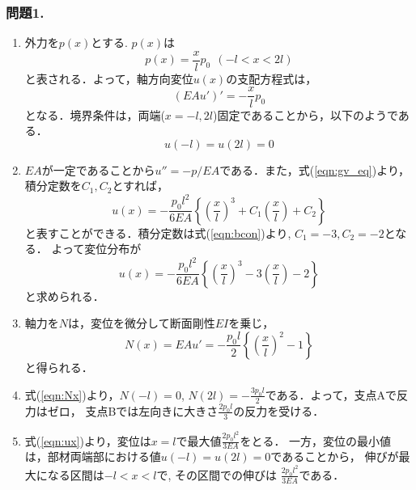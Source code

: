 \documentclass[10pt,a4j]{jarticle}
\begin{document}
\subsubsection*{問題1.}
\begin{enumerate}
\item
	外力を$p(x)$とする. $p(x)$は
	\begin{equation}
		p(x)=\frac{x}{l}p_0 
		\ \ \left(-l < x < 2l \right)
		\label{eqn:px}
	\end{equation}
	と表される．よって，軸方向変位$u(x)$の支配方程式は，
	\begin{equation}
		\left( EAu' \right)'=-\frac{x}{l}p_0
		\label{eqn:gv_eq}
	\end{equation}
	となる．境界条件は，両端($x=-l,2l$)固定であることから，以下のようである．
	\begin{equation}
		u(-l)=u(2l)=0
		\label{eqn:bcon}
	\end{equation}
\item
	$EA$が一定であることから$u''=-p/EA$である．また，式(\ref{eqn:gv_eq})より，
	積分定数を$C_1, C_2$とすれば，
	\begin{equation}
		u(x)=-\frac{p_0l^2}{6EA}\left\{
			\left( \frac{x}{l}\right)^3
			+
			C_1\left( \frac{x}{l}\right)
			+
			C_2
		\right\}
	\end{equation}
	と表すことができる．積分定数は式(\ref{eqn:bcon})より, $C_1=-3, C_2=-2$となる．
	よって変位分布が
	\begin{equation}
		u(x)=-\frac{p_0l^2}{6EA}\left\{
			\left( \frac{x}{l}\right)^3
			-
			3
			\left( \frac{x}{l}\right)
			-2
		\right\}
		\label{eqn:ux}
	\end{equation}
	と求められる．
\item
	軸力を$N$は，変位を微分して断面剛性$EI$を乗じ，
	\begin{equation}
		N(x)=EAu'=-\frac{p_0l}{2}
			\left\{
			\left(\frac{x}{l}\right)^2 -1
			\right\}
		\label{eqn:Nx}
	\end{equation}
	と得られる．
\item
	式(\ref{eqn:Nx})より，$N(-l)=0$,
	$N(2l)=-\frac{3p_0l}{2}$である．よって，支点Aで反力はゼロ，
	支点Bでは左向きに大きさ$\frac{2p_0l}{3}$の反力を受ける．
\item
	式(\ref{eqn:ux})より，変位は$x=l$で最大値$\frac{2p_0l^2}{3EA}$をとる．
	一方，変位の最小値は，部材両端部における値$u(-l)=u(2l)=0$であることから，
	伸びが最大になる区間は$-l<x<l $で, その区間での伸びは
	$\frac{2p_0l^2}{3EA}$である．
\end{enumerate}
\newpage
\end{document}
